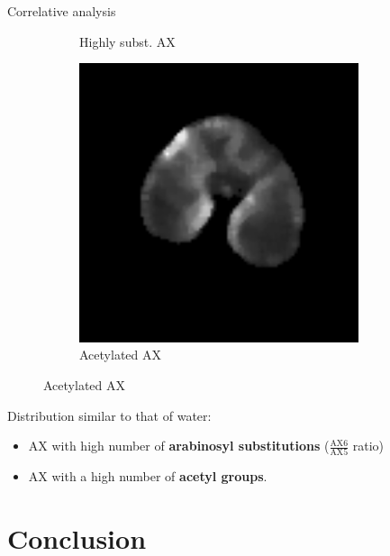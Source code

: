 \documentclass[10pt]{beamer}
\begin{document}
\begin{frame}{Correlative analysis}
\begin{figure}[ht]
\begin{subfigure}[t]{0.33\textwidth}
      \caption{Highly subst. AX}
      \label{subfig:3D_250DJ}
    \end{subfigure}%
    \begin{subfigure}[t]{0.33\textwidth}
      \centering
      \includegraphics[width=0.9\textwidth]{fig/t2_sic_n10_7_6.png}
      \caption{Acetylated AX}
      \label{subfig:zonetir_0}
    \end{subfigure}%


  \end{figure}
  \vspace{-0.2cm}

  Distribution similar to that of water:
  \begin{itemize}
  \item AX with high number of \textbf{arabinosyl substitutions} ($\frac{\text{AX6}}{\text{AX5}}$ ratio)
  \item AX with a high number of \textbf{acetyl groups}.
  \end{itemize}


\end{frame}



\section{Conclusion}
\end{document}
